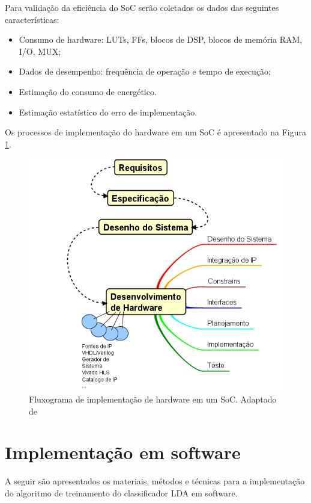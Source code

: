 Para validação da eficiência do SoC serão coletados os dados das seguintes características:
\begin{itemize}
  \item Consumo de hardware: LUTs, FFs, blocos de DSP, blocos de memória RAM, I/O, MUX;
  \item Dados de desempenho: frequência de operação e tempo de execução;
  \item Estimação do consumo de energético.
  \item Estimação estatístico do erro de implementação.
\end{itemize}

Os processos de implementação do hardware em um SoC é apresentado na Figura \ref{diagram_hardware}.

\begin{figure}[h]
  \centering
  \includegraphics[keepaspectratio=true,scale=1.0]{figuras/fluxograma_hardware.PNG}
  \caption{Fluxograma de implementação de hardware em um SoC. Adaptado de \cite{zynqBook}}
  \label{diagram_hardware}
\end{figure}

\section{Implementação em software}
A seguir são apresentados os materiais, métodos e técnicas para a implementação do
algoritmo de treinamento do classificador LDA em software.

